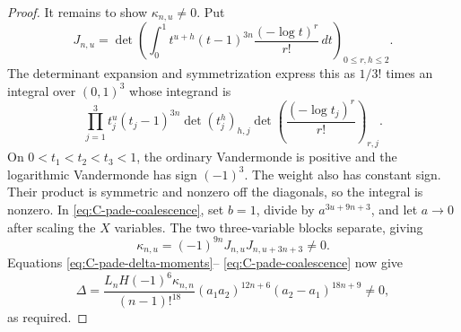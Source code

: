 \begin{proof}
It remains to show $\kappa_{n,u}\ne0$.  Put
\[
 J_{n,u}=\det\left(
  \int_0^1 t^{u+h}(t-1)^{3n}
          \frac{(-\log t)^r}{r!}\,dt
                  \right)_{0\le r,h\le2}.
\]
The determinant expansion and symmetrization express this as $1/3!$
times an integral over $(0,1)^3$ whose integrand is
\[
 \prod_{j=1}^3t_j^u(t_j-1)^{3n}
   \det(t_j^h)_{h,j}
   \det\!\left(\frac{(-\log t_j)^r}{r!}\right)_{r,j}.
\]
On $0<t_1<t_2<t_3<1$, the ordinary Vandermonde is positive and
the logarithmic Vandermonde has sign $(-1)^3$.  The weight also
has constant sign.  Their product is symmetric and nonzero off
the diagonals, so the integral is nonzero.  In
\eqref{eq:C-pade-coalescence}, set $b=1$, divide by
$a^{3u+9n+3}$, and let $a\to0$ after scaling the $X$ variables.
The two three-variable blocks separate, giving
\[
 \kappa_{n,u}=(-1)^{9n}J_{n,u}J_{n,u+3n+3}\ne0.
\]
Equations \eqref{eq:C-pade-delta-moments}--
\eqref{eq:C-pade-coalescence} now give
\[
 \Delta=\frac{L_nH(-1)^6\kappa_{n,n}}{(n-1)!^{18}}
       (a_1a_2)^{12n+6}(a_2-a_1)^{18n+9}\ne0,
\]
as required.
\end{proof}

